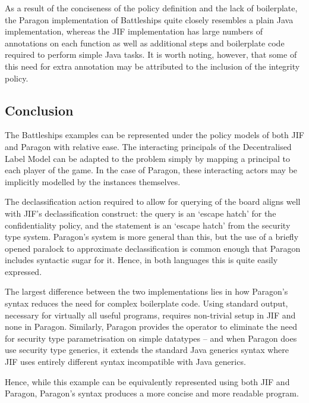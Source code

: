 As a result of the conciseness of the policy definition and the lack of boilerplate, the Paragon implementation of Battleships quite closely resembles a plain Java implementation, whereas the JIF implementation has large numbers of annotations on each function as well as additional steps and boilerplate code required to perform simple Java tasks. It is worth noting, however, that some of this need for extra annotation may be attributed to the inclusion of the integrity policy.

\subsection{Conclusion}

The Battleships examples can be represented under the policy models of both JIF and Paragon with relative ease. The interacting principals of the Decentralised Label Model can be adapted to the problem simply by mapping a principal to each player of the game. In the case of Paragon, these interacting actors may be implicitly modelled by the  instances themselves.

The declassification action required to allow for querying of the board aligns well with JIF's declassification construct: the query is an `escape hatch' for the confidentiality policy, and the  statement is an `escape hatch' from the security type system. Paragon's system is more general than this, but the use of a briefly opened paralock to approximate declassification is common enough that Paragon includes syntactic sugar for it. Hence, in both languages this is quite easily expressed.

The largest difference between the two implementations lies in how Paragon's syntax reduces the need for complex boilerplate code. Using standard output, necessary for virtually all useful programs, requires non-trivial setup in JIF and none in Paragon. Similarly, Paragon provides the  operator to eliminate the need for security type parametrisation on simple datatypes -- and when Paragon does use security type generics, it extends the standard Java generics syntax where JIF uses entirely different syntax incompatible with Java generics.

Hence, while this example can be equivalently represented using both JIF and Paragon, Paragon's syntax produces a more concise and more readable program.